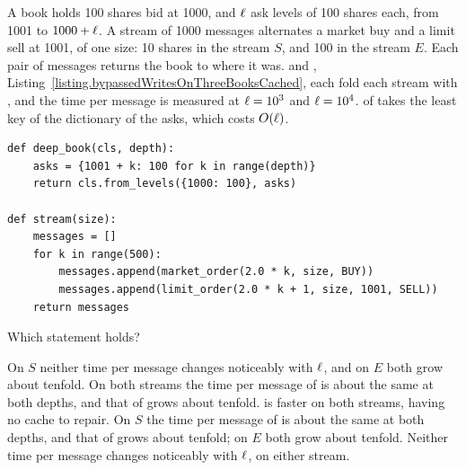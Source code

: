 \begin{question}
\label{question.cachedBestPriceWhenTheTouchEmpties}
A book holds 100 shares bid at 1000,
and $\ell$ ask levels of 100 shares each, from 1001 to $1000 + \ell$.
A stream of 1000 messages alternates a market buy and a limit sell at 1001, of one size:
10 shares in the stream $S$, and 100 in the stream $E$.
Each pair of messages returns the book to where it was.
 and ,
Listing~\ref{listing.bypassedWritesOnThreeBooksCached},
each fold each stream with ,
and the time per message is measured at $\ell = 10^{3}$ and $\ell = 10^{4}$.
 of  takes the least key of the dictionary of the asks,
which costs $O(\ell)$.
\begin{lstlisting}[caption={The book and the two streams}, label=listing.cachedBestPriceWhenTheTouchEmptiesStreams]
def deep_book(cls, depth):
    asks = {1001 + k: 100 for k in range(depth)}
    return cls.from_levels({1000: 100}, asks)

def stream(size):
    messages = []
    for k in range(500):
        messages.append(market_order(2.0 * k, size, BUY))
        messages.append(limit_order(2.0 * k + 1, size, 1001, SELL))
    return messages
\end{lstlisting}
Which statement holds?
\begin{choices}
 \choice On $S$ neither time per message changes noticeably with $\ell$,
  and on $E$ both grow about tenfold.
 \choice On both streams the time per message of  is about the same at both depths,
  and that of  grows about tenfold.
 \choice {} is faster on both streams, having no cache to repair.
 \correctchoice On $S$ the time per message of  is about the same at both depths,
  and that of  grows about tenfold;
  on $E$ both grow about tenfold.
 \choice Neither time per message changes noticeably with $\ell$, on either stream.
\end{choices}
\end{question}

